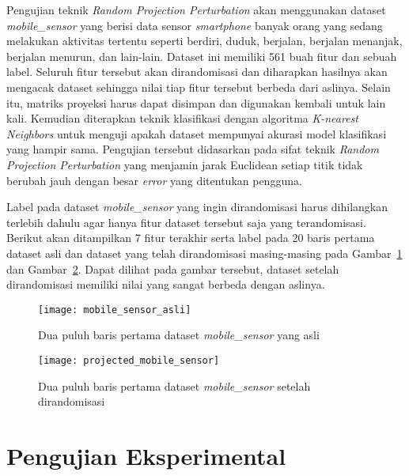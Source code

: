Pengujian teknik \textit{Random Projection Perturbation} akan menggunakan dataset \textit{mobile\_sensor} yang berisi data sensor \textit{smartphone} banyak orang yang sedang melakukan aktivitas tertentu seperti berdiri, duduk, berjalan, berjalan menanjak, berjalan menurun, dan lain-lain. Dataset ini memiliki 561 buah fitur dan sebuah label. Seluruh fitur tersebut akan dirandomisasi dan diharapkan hasilnya akan mengacak dataset sehingga nilai tiap fitur tersebut berbeda dari aslinya. Selain itu, matriks proyeksi harus dapat disimpan dan digunakan kembali untuk lain kali. Kemudian diterapkan teknik klasifikasi dengan algoritma \textit{K-nearest Neighbors} untuk menguji apakah dataset mempunyai akurasi model klasifikasi yang hampir sama. Pengujian tersebut didasarkan pada sifat teknik \textit{Random Projection Perturbation} yang menjamin jarak Euclidean setiap titik tidak berubah jauh dengan besar \textit{error} yang ditentukan pengguna.

Label pada dataset \textit{mobile\_sensor} yang ingin dirandomisasi harus dihilangkan terlebih dahulu agar hanya fitur dataset tersebut saja yang terandomisasi. Berikut akan ditampilkan 7 fitur terakhir serta label pada 20 baris pertama dataset asli dan dataset yang telah dirandomisasi masing-masing pada Gambar~\ref{fig:mobile_sensor_asli} dan Gambar~\ref{fig:projected_mobile_sensor}. Dapat dilihat pada gambar tersebut, dataset setelah dirandomisasi memiliki nilai yang sangat berbeda dengan aslinya. 

\begin{figure}
	\centering
	\texttt{[image: mobile\_sensor\_asli]}
	\caption{Dua puluh baris pertama dataset \textit{mobile\_sensor} yang asli}
	\label{fig:mobile_sensor_asli}
\end{figure}

\begin{figure}
	\centering
	\texttt{[image: projected\_mobile\_sensor]}
	\caption{Dua puluh baris pertama dataset \textit{mobile\_sensor} setelah dirandomisasi}
	\label{fig:projected_mobile_sensor}
\end{figure}

\section{Pengujian Eksperimental}
\label{sec:pengujianeksperimental}

